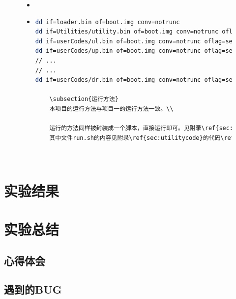 \documentclass[a4paper]{article}
\begin{document}
    \begin{figure}
    \begin{itemize}
        \item[]
    \end{itemize}
    \end{figure}


    \begin{figure}
    \begin{itemize}
    \item[] \begin{lstlisting}[language=sh, label=lst:build, caption=caption]
dd if=loader.bin of=boot.img conv=notrunc
dd if=Utilities/utility.bin of=boot.img conv=notrunc oflag=seek_bytes seek="$((512*1))"
dd if=userCodes/ul.bin of=boot.img conv=notrunc oflag=seek_bytes seek="$((512*2))"
dd if=userCodes/up.bin of=boot.img conv=notrunc oflag=seek_bytes seek="$((512*3))"
// ...
// ...
dd if=userCodes/dr.bin of=boot.img conv=notrunc oflag=seek_bytes seek="$((512*7))"

    \subsection{运行方法}
    本项目的运行方法与项目一的运行方法一致。\\
    
    运行的方法同样被封装成一个脚本，直接运行即可。见附录\ref{sec:utilitycode}的代码\ref{lst:run}.
    其中文件run.sh的内容见附录\ref{sec:utilitycode}的代码\ref{lst:shrun}.此处不再赘述。

    
    \end{lstlisting}
    \end{itemize}
    \end{figure}
\section{实验结果}
    \lipsum[1]
\section{实验总结}
    \subsection{心得体会}
    \lipsum[1]
    \subsection{遇到的BUG}
\end{document}
